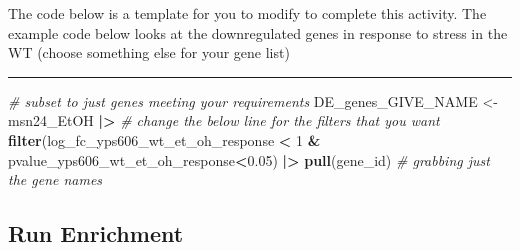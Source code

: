 \documentclass[
]{book}
\newenvironment{Shaded}{\begin{snugshade}}{\end{snugshade}}
\newcommand{\AttributeTok}[1]{\textcolor[rgb]{0.13,0.29,0.53}{#1}}
\newcommand{\CommentTok}[1]{\textcolor[rgb]{0.56,0.35,0.01}{\textit{#1}}}
\newcommand{\DecValTok}[1]{\textcolor[rgb]{0.00,0.00,0.81}{#1}}
\newcommand{\FloatTok}[1]{\textcolor[rgb]{0.00,0.00,0.81}{#1}}
\newcommand{\FunctionTok}[1]{\textcolor[rgb]{0.13,0.29,0.53}{\textbf{#1}}}
\newcommand{\NormalTok}[1]{#1}
\newcommand{\OtherTok}[1]{\textcolor[rgb]{0.56,0.35,0.01}{#1}}
\newcommand{\SpecialCharTok}[1]{\textcolor[rgb]{0.81,0.36,0.00}{\textbf{#1}}}
\newcommand{\StringTok}[1]{\textcolor[rgb]{0.31,0.60,0.02}{#1}}
\begin{document}
The code below is a template for you to modify to complete this activity. The example code below looks at the downregulated genes in response to stress in the WT (choose something else for your gene list)

\begin{center}\rule{0.5\linewidth}{0.5pt}\end{center}

\begin{Shaded}
\begin{Highlighting}[]
\CommentTok{\# subset to just genes meeting your requirements}
\NormalTok{DE\_genes\_GIVE\_NAME }\OtherTok{\textless{}{-}}\NormalTok{ msn24\_EtOH }\SpecialCharTok{|\textgreater{}}
  \CommentTok{\# change the below line for the filters that you want}
  \FunctionTok{filter}\NormalTok{(log\_fc\_yps606\_wt\_et\_oh\_response }\SpecialCharTok{\textless{}} \DecValTok{1} \SpecialCharTok{\&}\NormalTok{ pvalue\_yps606\_wt\_et\_oh\_response}\SpecialCharTok{\textless{}}\FloatTok{0.05}\NormalTok{) }\SpecialCharTok{|\textgreater{}} 
  \FunctionTok{pull}\NormalTok{(gene\_id) }\CommentTok{\# grabbing just the gene names}
\end{Highlighting}
\end{Shaded}

\hypertarget{run-enrichment}{%
\subsection{Run Enrichment}\label{run-enrichment}}

\begin{Shaded}
\end{Shaded}
\end{document}
